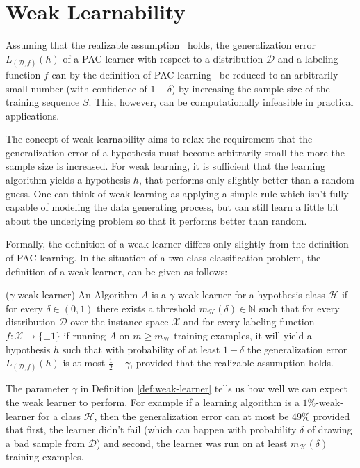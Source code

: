 \section{Weak Learnability}

Assuming that the realizable assumption~\cite[chapter 2]{SSBD14} holds, the generalization error
$L_{(\mathcal{D}, f)}(h)$ of a PAC learner with respect to a distribution $\mathcal{D}$ and a
labeling function $f$ can by the definition of PAC learning~\mbox{\cite[chapter 2]{SSBD14}} be reduced to an arbitrarily
small number (with confidence of $1-\delta$) by increasing the sample size of the training sequence $S$.
This, however, can be computationally infeasible in practical applications.

The concept of weak learnability aims to relax the requirement that the generalization error of a hypothesis must
become arbitrarily small the more the sample size is increased.
For weak learning, it is sufficient that the learning algorithm yields a hypothesis $h$, that performs only slightly
better than a random guess.
One can think of weak learning as applying a simple rule which isn't fully capable of modeling the data generating process,
but can still learn a little bit about the underlying problem so that it performs better than random.

Formally, the definition of a weak learner differs only slightly from the definition of PAC learning.
In the situation of a two-class classification problem, the definition of a weak learner, can be given as follows:

\begin{definition}{($\gamma$-weak-learner)}
\label{def:weak-learner}
An Algorithm $A$ is a $\gamma$-weak-learner for a hypothesis class $\mathcal{H}$ if for every $\delta \in (0, 1)$ there
exists a threshold $m_\mathcal{H}(\delta) \in \mathbb{N}$
such that for every distribution $\mathcal{D}$ over the instance space $\mathcal{X}$
and for every labeling function $f: \mathcal{X} \rightarrow \{\pm 1\}$ if running $A$ on $m \geq m_\mathcal{H}$ training
examples, it will yield a hypothesis $h$ such that with probability of at least $1-\delta$ the generalization error
$L_{(\mathcal{D}, f)}(h)$ is at most $\frac{1}{2} - \gamma$, provided that the realizable assumption holds.
\end{definition}

The parameter $\gamma$ in Definition \ref{def:weak-learner} tells us how well we can expect the weak learner to perform.
For example if a learning algorithm is a $1\%$-weak-learner for a class $\mathcal{H}$, then the generalization
error can at most be $49\%$ provided that first, the learner didn't fail
(which can happen with probability $\delta$ of drawing a bad sample from $\mathcal{D}$)
and second, the learner was run on at least $m_\mathcal{H}(\delta)$ training examples.


